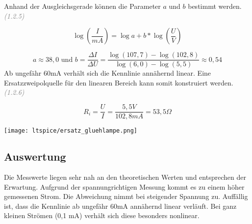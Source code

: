 	Anhand der Ausgleichsgerade können die Parameter $a$ und $b$ bestimmt werden. \textcolor{gray}{\textit{(1.2.5)}}
	
	\begin{equation*}
		\log(\frac{I}{mA}) = \log a+ b * \log(\frac{U}{V})
	\end{equation*}

	\begin{equation*}
	a \approx 38,0 \text{ und } b = \frac{\varDelta I}{\varDelta U} = \frac{\log(107,7)-\log(102,8)}{\log(6,0)-\log(5,5)} \approx 0,54
	\end{equation*}
	\newpage
	\thispagestyle{fancy}
	Ab ungefähr 60mA verhält sich die Kennlinie annähernd linear. Eine Ersatzzweipolquelle für den linearen Bereich kann somit konstruiert werden. \textcolor{gray}{\textit{(1.2.6)}}
	
	\begin{equation*}
	R_i = \frac{U}{I} = \frac{5,5V}{102,8mA} = 53,5\Omega 
	\end{equation*}
	
	\begin{center}
		\texttt{[image: ltspice/ersatz\_gluehlampe.png]}
	\end{center}
	
	\subsection{Auswertung}
	
	Die Messwerte liegen sehr nah an den theoretischen Werten und entsprechen der Erwartung. Aufgrund der spannungrichtigen Messung kommt es zu einem höher gemessenen Strom. Die Abweichung nimmt bei steigender Spannung zu. Auffällig ist, dass die Kennlinie ab ungefähr 60mA annähernd linear verläuft. Bei ganz kleinen Strömen (0,1 mA) verhält sich diese besonders nonlinear.
	



